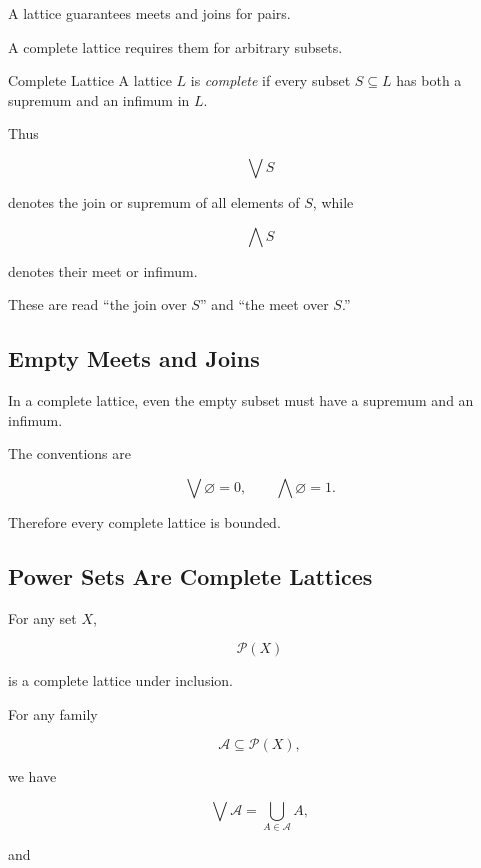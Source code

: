 A lattice guarantees meets and joins for pairs.

A complete lattice requires them for arbitrary subsets.

\begin{definitionbox}{Complete Lattice}
A lattice \(L\) is \emph{complete} if every subset \(S\subseteq L\) has both
a supremum and an infimum in \(L\).
\end{definitionbox}

Thus

\[ \bigvee S \]

denotes the join or supremum of all elements of \(S\), while

\[ \bigwedge S \]

denotes their meet or infimum.

These are read ``the join over \(S\)'' and ``the meet over \(S\).''

\subsection{Empty Meets and Joins}
\label{subsec:empty-meets-joins}

In a complete lattice, even the empty subset must have a supremum and an
infimum.

The conventions are

\[ \bigvee\varnothing=0, \qquad \bigwedge\varnothing=1. \]

Therefore every complete lattice is bounded.

\subsection{Power Sets Are Complete Lattices}
\label{subsec:powerset-complete}

For any set \(X\),

\[ \mathcal P(X) \]

is a complete lattice under inclusion.

For any family

\[ \mathcal A\subseteq\mathcal P(X), \]

we have

\[ \bigvee\mathcal A=\bigcup_{A\in\mathcal A}A, \]

and

